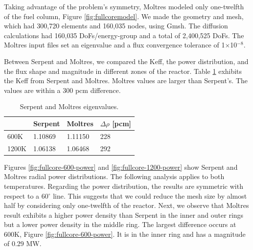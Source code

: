 Taking advantage of the problem's symmetry, Moltres modeled only one-twelfth of the fuel column, Figure \ref{fig:fullcoremodel}.
We made the geometry and mesh, which had 300,720 elements and 160,035 nodes, using Gmsh.
The diffusion calculations had 160,035 \glspl{DoF}/energy-group and a total of 2,400,525 DoFs.
The Moltres input files set an eigenvalue and a flux convergence tolerance of 1$\times$10$^{-8}$.

Between Serpent and Moltres, we compared the \gls{Keff}, the power distribution, and the flux shape and magnitude in different zones of the reactor.
Table \ref{tab:full-keff} exhibits the \gls{Keff} from Serpent and Moltres.
Moltres values are larger than Serpent's.
The values are within a 300 pcm difference.

\begin{table}[htbp!]
  \centering
  \caption{Serpent and Moltres eigenvalues.}
  \begin{tabular}{l|lll}
  \toprule
              & Serpent			& Moltres  & $\Delta \rho$ [pcm] 	\\
  \midrule
			 600K  	& 1.10869     & 1.11150	 &	228		\\
			1200K 	& 1.06138     & 1.06468	 &	292   \\

  \bottomrule
  \end{tabular}
  \label{tab:full-keff}
\end{table}

Figures \ref{fig:fullcore-600-power} and \ref{fig:fullcore-1200-power} show Serpent and Moltres radial power distributions.
The following analysis applies to both temperatures.
Regarding the power distribution, the results are symmetric with respect to a 60$^{\circ}$ line.
This suggests that we could reduce the mesh size by almost half by considering only one-twelfth of the reactor.
Next, we observe that Moltres result exhibits a higher power density than Serpent in the inner and outer rings but a lower power density in the middle ring.
The largest difference occurs at 600K, Figure \ref{fig:fullcore-600-power}.
It is in the inner ring and has a magnitude of 0.29 MW.

